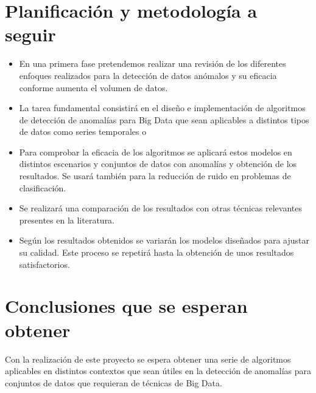 \documentclass[11pt]{article}
\begin{document}
\section{Planificación y metodología a seguir}
\label{sec:org3a4e830}

\begin{itemize}
\item En una primera fase pretendemos realizar una revisión de los
diferentes enfoques realizados para la detección de datos anómalos y
su eficacia conforme aumenta el volumen de datos.
\item La tarea fundamental consistirá en el diseño e implementación de
algoritmos de detección de anomalías para Big Data que sean
aplicables a distintos tipos de datos como series temporales o
\item Para comprobar la eficacia de los algoritmos se aplicará estos
modelos en distintos escenarios y conjuntos de datos con anomalías y
obtención de los resultados. Se usará también para la
reducción de ruido en problemas de clasificación.
\item Se realizará una comparación de los resultados con otras técnicas
relevantes presentes en la literatura.
\item Según los resultados obtenidos se variarán los modelos diseñados
para ajustar su calidad. Este proceso se repetirá hasta la obtención
de unos resultados satisfactorios.
\end{itemize}

\section{Conclusiones que se esperan obtener}
\label{sec:org9f2a410}

Con la realización de este proyecto se espera obtener una serie de
algoritmos aplicables en distintos contextos que sean útiles en la
detección de anomalías para conjuntos de datos que requieran de
técnicas de Big Data.


\end{document}
